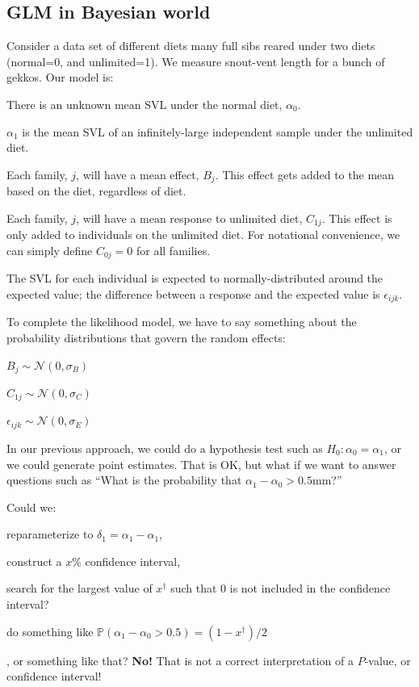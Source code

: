 \documentclass[11pt]{article}
\renewcommand{\Pr}{{\mathbb P}}
\begin{document}
\subsection*{GLM in Bayesian world}
Consider a data set of different diets many full sibs reared under two diets (normal=0, and unlimited=1).
We measure snout-vent length for a bunch of gekkos.
Our model is:
\begin{compactitem}
	\item There is an unknown mean SVL under the normal diet, $\alpha_0$.
	\item $\alpha_1$ is the mean SVL of an infinitely-large independent sample under the unlimited diet.
	\item Each family, $j$, will have a mean effect, $B_j$. This effect gets added to the mean based on the diet, regardless of diet.
	\item Each family, $j$, will have a mean response to unlimited diet, $C_{1j}$. This effect is only added to individuals on the unlimited diet. For notational convenience, we can simply define $C_{0j}=0$ for all families.
	\item The SVL for each individual is expected to normally-distributed around the expected value; the difference between a response and the expected value is $\epsilon_{ijk}$.
\end{compactitem}
To complete the likelihood model, we have to say something about the probability distributions that govern the random effects:
\begin{compactitem}
	\item $B_j \sim \mathcal{N}(0, \sigma_B)$
	\item $C_{1j} \sim \mathcal{N}(0, \sigma_C)$
	\item $\epsilon_{ijk} \sim \mathcal{N}(0, \sigma_E)$
\end{compactitem}

In our previous approach, we could do a hypothesis test such as $H_0: \alpha_0 = \alpha_1$, or we could generate point estimates.
That is OK, but what if we want to answer questions such as ``What is the probability that $\alpha_1 - \alpha_0 > 0.5$mm?''

Could we:
\begin{compactitem}
	\item reparameterize to $\delta_1 = \alpha_1 - \alpha_1$,
	\item construct a $x\%$ confidence interval,
	\item search for the largest value of $x^{\dag}$ such that 0 is not included in the confidence interval?
	\item do something like $\Pr(\alpha_1 - \alpha_0 > 0.5) = (1-x^{\dag})/2$
\end{compactitem}
, or something like that? {\bf No!} That is not a correct interpretation of a $P$-value, or confidence interval!
\end{document}
